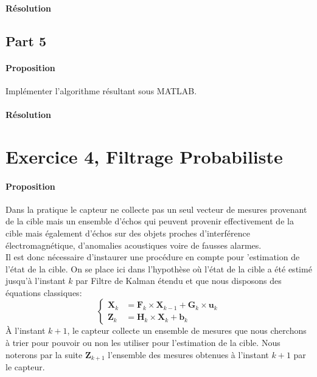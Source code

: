 \documentclass{article}
\begin{document}
\paragraph{Résolution}


\subsection{Part 5}
\paragraph{Proposition}Implémenter l'algorithme résultant sous MATLAB.

\paragraph{Résolution}



\section{Exercice 4, Filtrage Probabiliste}
\paragraph{Proposition}Dans la pratique le capteur ne collecte pas un seul vecteur de mesures provenant de la cible mais un ensemble d'échos qui peuvent provenir effectivement de la cible mais également d'échos sur des objets proches d'interférence électromagnétique, d'anomalies acoustiques voire de fausses alarmes.\\

\noindent Il est donc nécessaire d'instaurer une procédure en compte pour 'estimation de l'état de la cible. On se place ici dans l'hypothèse où l'état de la cible a été estimé jusqu'à l'instant $k$ par Filtre de Kalman étendu et que nous disposons des équations classiques:
\begin{equation*}
    \begin{cases}
        \mathbf{X}_{k} &= \mathbf{F}_{k} \times \mathbf{X}_{k-1} + \mathbf{G}_{k} \times \mathbf{u}_{k}\\
        \mathbf{Z}_{k} &= \mathbf{H}_{k} \times \mathbf{X}_{k} + \mathbf{b}_{k}
    \end{cases}
\end{equation*}
À l'instant $k+1$, le capteur collecte un ensemble de mesures que nous cherchons à trier pour pouvoir ou non les utiliser pour l'estimation de la cible. Nous noterons par la suite $\mathbf{Z}_{k+1}$ l'ensemble des mesures obtenues à l'instant $k+1$ par le capteur.
\end{document}
